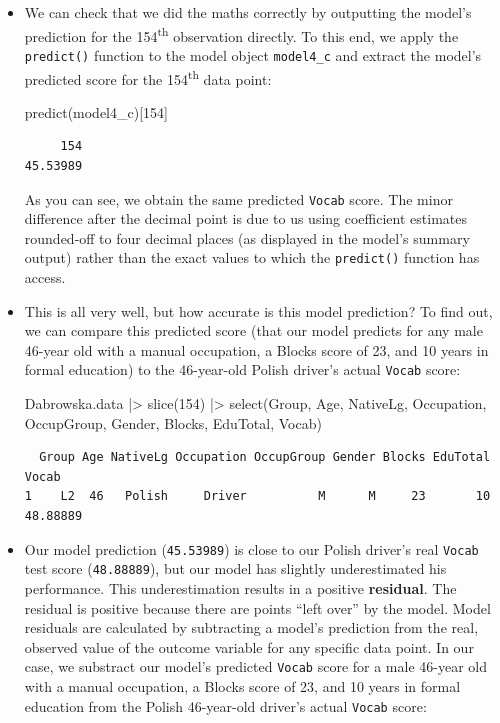 \documentclass[
  letterpaper,
  DIV=11,
  numbers=noendperiod]{scrreprt}
\newenvironment{Shaded}{\begin{snugshade}}{\end{snugshade}}
\newcommand{\DecValTok}[1]{\textcolor[rgb]{0.68,0.00,0.00}{#1}}
\newcommand{\FunctionTok}[1]{\textcolor[rgb]{0.28,0.35,0.67}{#1}}
\newcommand{\NormalTok}[1]{\textcolor[rgb]{0.00,0.23,0.31}{#1}}
\newcommand{\SpecialCharTok}[1]{\textcolor[rgb]{0.37,0.37,0.37}{#1}}
\begin{document}
\begin{itemize}
\item
  We can check that we did the maths correctly by outputting the model's
  prediction for the 154\textsuperscript{th} observation directly. To
  this end, we apply the \texttt{predict()} function to the model object
  \texttt{model4\_c} and extract the model's predicted score for the
  154\textsuperscript{th} data point:

\begin{Shaded}
\begin{Highlighting}[]
\FunctionTok{predict}\NormalTok{(model4\_c)[}\DecValTok{154}\NormalTok{]}
\end{Highlighting}
\end{Shaded}

\begin{verbatim}
     154 
45.53989 
\end{verbatim}

  As you can see, we obtain the same predicted \texttt{Vocab} score. The
  minor difference after the decimal point is due to us using
  coefficient estimates rounded-off to four decimal places (as displayed
  in the model's summary output) rather than the exact values to which
  the \texttt{predict()} function has access.
\item
  This is all very well, but how accurate is this model prediction? To
  find out, we can compare this predicted score (that our model predicts
  for any male 46-year old with a manual occupation, a Blocks score of
  23, and 10 years in formal education) to the 46-year-old Polish
  driver's actual \texttt{Vocab} score:

\begin{Shaded}
\begin{Highlighting}[]
\NormalTok{Dabrowska.data }\SpecialCharTok{|\textgreater{}} 
  \FunctionTok{slice}\NormalTok{(}\DecValTok{154}\NormalTok{) }\SpecialCharTok{|\textgreater{}} 
  \FunctionTok{select}\NormalTok{(Group, Age, NativeLg, Occupation, OccupGroup, Gender, Blocks, EduTotal, Vocab)}
\end{Highlighting}
\end{Shaded}

\begin{verbatim}
  Group Age NativeLg Occupation OccupGroup Gender Blocks EduTotal    Vocab
1    L2  46   Polish     Driver          M      M     23       10 48.88889
\end{verbatim}
\item
  Our model prediction (\texttt{45.53989}) is close to our Polish
  driver's real \texttt{Vocab} test score (\texttt{48.88889}), but our
  model has slightly underestimated his performance. This
  underestimation results in a positive \textbf{residual}. The residual
  is positive because there are points ``left over'' by the model. Model
  residuals are calculated by subtracting a model's prediction from the
  real, observed value of the outcome variable for any specific data
  point. In our case, we substract our model's predicted \texttt{Vocab}
  score for a male 46-year old with a manual occupation, a Blocks score
  of 23, and 10 years in formal education from the Polish 46-year-old
  driver's actual \texttt{Vocab} score:


\end{itemize}
\end{document}
